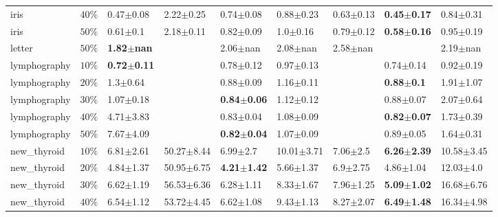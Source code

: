 \begin{tabular}{lllllllll}
         iris &     $ 40\% $ &           0.47$\pm$0.08 &   2.22$\pm$0.25 &            0.74$\pm$0.08 &            0.88$\pm$0.23 &   0.63$\pm$0.13 &   \textbf{0.45$\pm$0.17} &     0.84$\pm$0.31 \\
         iris &     $ 50\% $ &            0.61$\pm$0.1 &   2.18$\pm$0.11 &            0.82$\pm$0.09 &             1.0$\pm$0.16 &   0.79$\pm$0.12 &   \textbf{0.58$\pm$0.16} &     0.95$\pm$0.19 \\
       letter &     $ 50\% $ &   \textbf{1.82$\pm$nan} &                 &             2.06$\pm$nan &             2.08$\pm$nan &    2.58$\pm$nan &                          &      2.19$\pm$nan \\
 lymphography &     $ 10\% $ &  \textbf{0.72$\pm$0.11} &                 &            0.78$\pm$0.12 &            0.97$\pm$0.13 &                 &            0.74$\pm$0.14 &     0.92$\pm$0.19 \\
 lymphography &     $ 20\% $ &            1.3$\pm$0.64 &                 &            0.88$\pm$0.09 &            1.16$\pm$0.11 &                 &    \textbf{0.88$\pm$0.1} &     1.91$\pm$1.07 \\
 lymphography &     $ 30\% $ &           1.07$\pm$0.18 &                 &   \textbf{0.84$\pm$0.06} &            1.12$\pm$0.12 &                 &            0.88$\pm$0.07 &     2.07$\pm$0.64 \\
 lymphography &     $ 40\% $ &           4.71$\pm$3.83 &                 &            0.83$\pm$0.04 &            1.08$\pm$0.09 &                 &   \textbf{0.82$\pm$0.07} &     1.73$\pm$0.39 \\
 lymphography &     $ 50\% $ &           7.67$\pm$4.09 &                 &   \textbf{0.82$\pm$0.04} &            1.07$\pm$0.09 &                 &            0.89$\pm$0.05 &     1.64$\pm$0.31 \\
  new_thyroid &     $ 10\% $ &           6.81$\pm$2.61 &  50.27$\pm$8.44 &             6.99$\pm$2.7 &           10.01$\pm$3.71 &    7.06$\pm$2.5 &   \textbf{6.26$\pm$2.39} &    10.58$\pm$3.45 \\
  new_thyroid &     $ 20\% $ &           4.84$\pm$1.37 &  50.95$\pm$6.75 &   \textbf{4.21$\pm$1.42} &            5.66$\pm$1.37 &    6.9$\pm$2.75 &            4.86$\pm$1.04 &     12.03$\pm$4.0 \\
  new_thyroid &     $ 30\% $ &           6.62$\pm$1.19 &  56.53$\pm$6.36 &            6.28$\pm$1.11 &            8.33$\pm$1.67 &   7.96$\pm$1.25 &   \textbf{5.09$\pm$1.02} &    16.68$\pm$6.76 \\
  new_thyroid &     $ 40\% $ &           6.54$\pm$1.12 &  53.72$\pm$4.45 &            6.62$\pm$1.08 &            9.43$\pm$1.13 &   8.27$\pm$2.07 &   \textbf{6.49$\pm$1.48} &    16.34$\pm$4.98 \\

\end{tabular}
